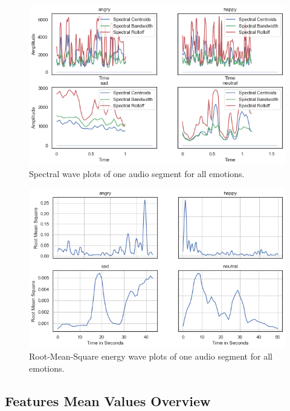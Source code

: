 \begin{figure}[H]
	\centering
	\includegraphics[width=\linewidth]{figs/appendix/feature_selection/specWP.png}
	\caption{Spectral wave plots of one audio segment for all emotions.}
	\label{fig:SpecWP}
\end{figure}

\begin{figure}[H]
	\centering
	\includegraphics[width=\linewidth]{figs/appendix/feature_selection/rmseWP.png}
	\caption{Root-Mean-Square energy wave plots of one audio segment for all emotions.}
	\label{fig:rmseWP}
\end{figure}


\subsection{Features Mean Values Overview} \label{app:2}

